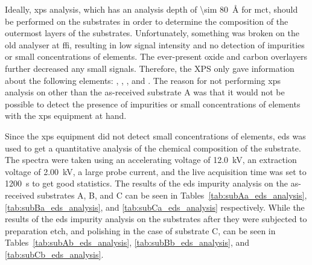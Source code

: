  Ideally, \ac{xps} analysis, which has an analysis depth of \SI{\sim 80}{\angstrom} for \ac{mct}, should be performed on the substrates in order to determine the composition of the outermost layers of the substrates. Unfortunately, something was broken on the old analyser at \ac{ffi}, resulting in low signal intensity and no detection of impurities or small concentrations of elements. The ever-present oxide and carbon overlayers further decreased any small signals. Therefore, the XPS only gave information about the following elements: , , , and . The reason for not performing \ac{xps} analysis on other than the as-received substrate A was that it would not be possible to detect the presence of impurities or small concentrations of elements with the \ac{xps} equipment at hand.


Since the \ac{xps} equipment did not detect small concentrations of elements, \ac{eds} was used to get a quantitative analysis of the chemical composition of the substrate. The spectra were taken using an accelerating voltage of \SI{12.0}{\kilo\volt}, an extraction voltage of \SI{2.00}{\kilo\volt}, a large probe current, and the live acquisition time was set to \SI{1200}{\second} to get good statistics. The results of the \ac{eds} impurity analysis on the as-received substrates A, B, and C can be seen in Tables~\ref{tab:subAa_eds_analysis}, \ref{tab:subBa_eds_analysis}, and \ref{tab:subCa_eds_analysis} respectively. While the results of the \ac{eds} impurity analysis on the substrates after they were subjected to preparation etch, and polishing in the case of substrate C, can be seen in Tables~\ref{tab:subAb_eds_analysis}, \ref{tab:subBb_eds_analysis}, and \ref{tab:subCb_eds_analysis}.


